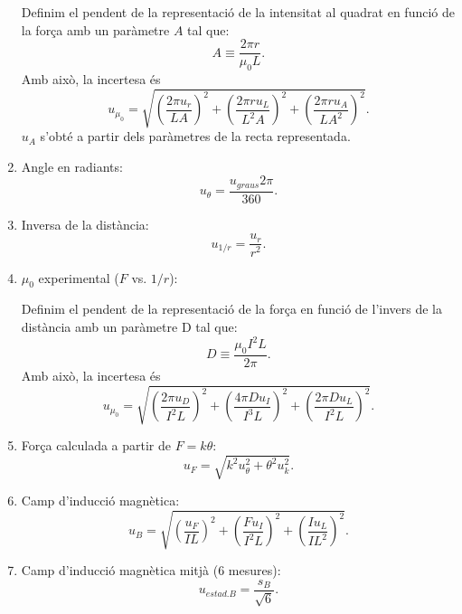 \documentclass[a4paper,10.5pt]{report}
\begin{document}
\begin{appendices}
\begin{enumerate}
	Definim el pendent de la representació de la intensitat al quadrat en funció de la força amb un paràmetre $A$ tal que:
	\begin{equation*}
		A\equiv\frac{2\pi r}{\mu_0L}.
	\end{equation*}
	Amb això, la incertesa és
	\begin{equation}
		u_{\mu_0}=\sqrt{\left(\frac{2\pi u_r}{LA}\right)^2+\left(\frac{2\pi r u_L}{L^2A}\right)^2+\left(\frac{2\pi ru_A}{LA^2}\right)^2}.
	\end{equation}
	$u_A$ s'obté a partir dels paràmetres de la recta representada.
	\item Angle en radiants: \begin{equation}
		u_{\theta}=\frac{u_{graus}2\pi}{360}.
	\end{equation}
	\item Inversa de la distància: \begin{equation}
		u_{1/r}=\frac{u_r}{r^2}.
	\end{equation}
	\item $\mu_0$ experimental ($F$ vs. $1/r$):
	
	Definim el pendent de la representació de la força en funció de l'invers de la distància amb un paràmetre D tal que: \begin{equation*}
		D\equiv\frac{\mu_0I^2L}{2\pi}.
	\end{equation*}
	Amb això, la incertesa és
	\begin{equation}
		u_{\mu_0}=\sqrt{\left(\frac{2\pi u_D}{I^2L}\right)^2+\left(\frac{4\pi Du_I}{I^3L}\right)^2+\left(\frac{2\pi D u_L}{I^2L}\right)^2}.
	\end{equation}
	\item Força calculada a partir de $F=k\theta$: \begin{equation}
		u_F=\sqrt{k^2u_{\theta}^2+\theta^2u_{k}^2}.
	\end{equation}
	\item Camp d'inducció magnètica: \begin{equation}
		u_B=\sqrt{\left(\frac{u_F}{IL}\right)^2+\left(\frac{Fu_I}{I^2L}\right)^2+\left(\frac{Iu_L}{IL^2}\right)^2}.
	\end{equation}
	\item Camp d'inducció magnètica mitjà (6 mesures): \begin{equation}
		u_{estad.B}=\frac{s_B}{\sqrt{6}}.
	\end{equation}
\end{enumerate}

\end{appendices}
\end{document}
